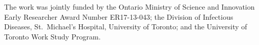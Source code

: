 The work was jointly funded by the Ontario Ministry of Science and Innovation Early Researcher Award Number ER17-13-043; the Division of Infectious Diseases, St.\ Michael's Hospital, University of Toronto; and the University of Toronto Work Study Program.